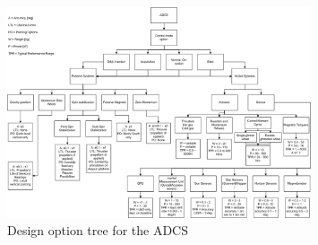 \begin{figure}
\includegraphics[width=0.8\textwidth, angle=90]{img/DOTadcs.png}
\caption{Design option tree for the \ac{ADCS}}
\label{pic_DOTadcs}
\end{figure}